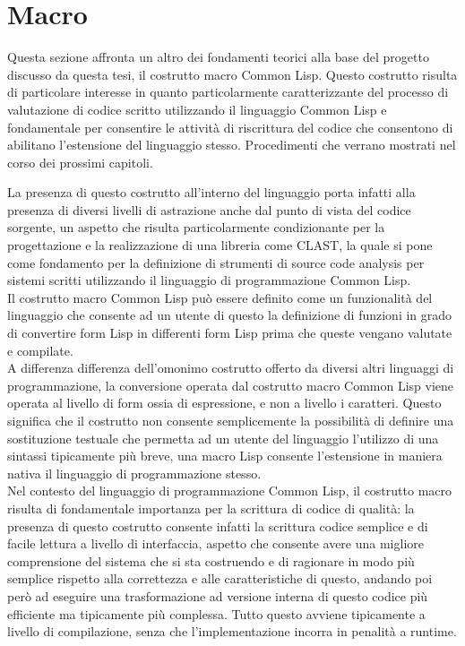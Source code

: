 \section{Macro}
\label{macro}

Questa sezione affronta un altro dei fondamenti teorici alla base del progetto
discusso da questa tesi, il costrutto macro Common Lisp. Questo costrutto
risulta di particolare interesse in quanto particolarmente caratterizzante del
processo di valutazione di codice scritto utilizzando il linguaggio Common Lisp
e fondamentale per consentire le attività di riscrittura del codice che
consentono di abilitano l’estensione del linguaggio stesso. Procedimenti che
verrano mostrati nel corso dei prossimi capitoli.

La presenza di questo costrutto all'interno del linguaggio porta infatti alla
presenza di diversi livelli di astrazione anche dal punto di vista del codice
sorgente, un aspetto che risulta particolarmente condizionante per la
progettazione e la realizzazione di una libreria come CLAST, la quale si pone
come fondamento per la definizione di strumenti di source code analysis per
sistemi scritti utilizzando il linguaggio di programmazione Common Lisp.\\

Il costrutto macro Common Lisp può essere definito come un funzionalità del
linguaggio che consente ad un utente di questo la definizione di funzioni in
grado di convertire form Lisp in differenti form Lisp prima che queste vengano
valutate e compilate.\\

A differenza differenza dell'omonimo costrutto offerto da diversi altri
linguaggi di programmazione, la conversione operata dal costrutto macro Common
Lisp viene operata al livello di form ossia di espressione, e non a livello i
caratteri. Questo significa che il costrutto non consente semplicemente la
possibilità di definire una sostituzione testuale che permetta ad un utente del
linguaggio l’utilizzo di una sintassi tipicamente più breve, una macro Lisp
consente l'estensione in maniera nativa il linguaggio di programmazione
stesso.\\

Nel contesto del linguaggio di programmazione Common Lisp, il costrutto macro
risulta di fondamentale importanza per la scrittura di codice di qualità: la
presenza di questo costrutto consente infatti la scrittura codice semplice e di
facile lettura a livello di interfaccia, aspetto che consente avere una migliore
comprensione del sistema che si sta costruendo e di ragionare in modo più
semplice rispetto alla correttezza e alle caratteristiche di questo, andando poi
però ad eseguire una trasformazione ad versione interna di questo codice più
efficiente ma tipicamente più complessa. Tutto questo avviene tipicamente a
livello di compilazione, senza che l'implementazione incorra in penalità a
runtime.\\

